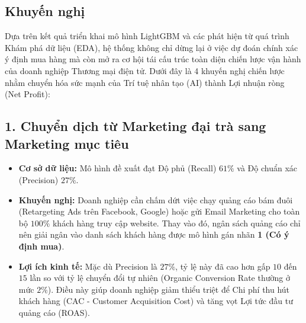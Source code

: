 \documentclass[a4paper,11pt]{article}
\begin{document}
\subsection{Khuyến nghị}
Dựa trên kết quả triển khai mô hình LightGBM và các phát hiện từ quá trình Khám phá dữ liệu (EDA), hệ thống không chỉ dừng lại ở việc dự đoán chính xác ý định mua hàng mà còn mở ra cơ hội tái cấu trúc toàn diện chiến lược vận hành của doanh nghiệp Thương mại điện tử. Dưới đây là 4 khuyến nghị chiến lược nhằm chuyển hóa sức mạnh của Trí tuệ nhân tạo (AI) thành Lợi nhuận ròng (Net Profit):

\subsection*{1. Chuyển dịch từ Marketing đại trà sang Marketing mục tiêu }
\begin{itemize}[itemsep=4pt, leftmargin=*]
    \item \textbf{Cơ sở dữ liệu:} Mô hình đề xuất đạt Độ phủ (Recall) $61\%$ và Độ chuẩn xác (Precision) $27\%$.
    \item \textbf{Khuyến nghị:} Doanh nghiệp cần chấm dứt việc chạy quảng cáo bám đuôi (Retargeting Ads trên Facebook, Google) hoặc gửi Email Marketing cho toàn bộ $100\%$ khách hàng truy cập website. Thay vào đó, ngân sách quảng cáo chỉ nên giải ngân vào danh sách khách hàng được mô hình gán nhãn \textbf{1 (Có ý định mua)}. 
    \item \textbf{Lợi ích kinh tế:} Mặc dù Precision là $27\%$, tỷ lệ này đã cao hơn gấp $10$ đến $15$ lần so với tỷ lệ chuyển đổi tự nhiên (Organic Conversion Rate thường ở mức $2\%$). Điều này giúp doanh nghiệp giảm thiểu triệt để Chi phí thu hút khách hàng (CAC - Customer Acquisition Cost) và tăng vọt Lợi tức đầu tư quảng cáo (ROAS).
\end{itemize}
\end{document}
